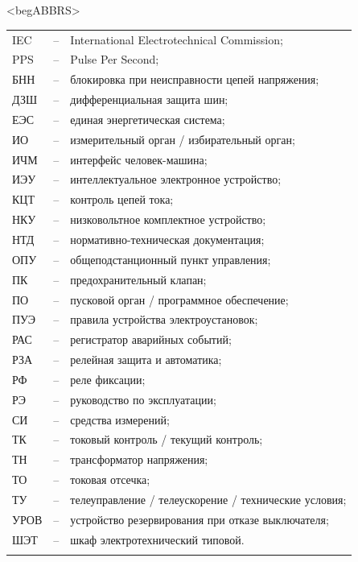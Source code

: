 \color{unimain}\section*{}
{\color{white}\fontsize{0.1pt}{0.1pt}\selectfont<begABBRS>}
\color{black}
\begin{longtable}{>{\raggedright\arraybackslash}m{2cm}>{\raggedright\arraybackslash}m{0.5cm}>{\raggedright\arraybackslash}m{20cm}}
\endfirsthead\endhead\endfoot\endlastfoot
IEC & -- &  International Electrotechnical Commission; \\
PPS & -- & Pulse Per Second; \\
БНН & -- & блокировка при неисправности цепей напряжения; \\
ДЗШ & -- & дифференциальная защита шин; \\
ЕЭС & -- & единая энергетическая система; \\
ИО & -- & измерительный орган / избирательный орган; \\
ИЧМ & -- & интерфейс человек-машина; \\
ИЭУ & -- & интеллектуальное электронное устройство; \\
КЦТ & -- & контроль цепей тока; \\
НКУ & -- & низковольтное комплектное устройство; \\
НТД & -- & нормативно-техническая документация; \\
ОПУ & -- & общеподстанционный пункт управления; \\
ПК & -- & предохранительный клапан; \\
ПО & -- & пусковой орган / программное обеспечение; \\
ПУЭ & -- & правила устройства электроустановок; \\
РАС & -- & регистратор аварийных событий; \\
РЗА & -- & релейная защита и автоматика; \\
РФ & -- & реле фиксации; \\
РЭ & -- & руководство по эксплуатации; \\
СИ & -- & средства измерений; \\
ТК & -- & токовый контроль / текущий контроль; \\
ТН & -- & трансформатор напряжения; \\
ТО & -- & токовая отсечка; \\
ТУ & -- & телеуправление / телеускорение / технические условия; \\
УРОВ & -- & устройство резервирования при отказе выключателя; \\
ШЭТ & -- & шкаф электротехнический типовой. \\
{\color{white}\fontsize{0.1pt}{0.1pt}\selectfont<endABBRS>}
\end{longtable}
